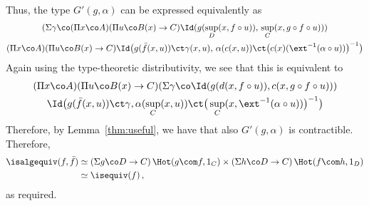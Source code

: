 Thus, the type $G'(g,\alpha)$ can be expressed equivalently as
\begin{multline*}
(\Sigma \gamma \co 
(\Pi x \co A)
(\Pi u \co B(x) \to C) 
\Id(g(\sup_D(x,f \circ u)),\, \sup_C(x,g \circ f \circ u))) \\ 
(\Pi x \co A) 
(\Pi u \co B(x) \to C) 
	\Id\big(g(\bar{f}(x,u)) \ct \gamma(x,u),\, \alpha(c(x,u)) \ct \big(c(x)(\ext^{-1}(\alpha \circ u))\big)^{-1}\big)
\end{multline*}
Again using the type-theoretic distributivity, we see that this is equivalent to
\begin{multline*}
(\Pi x \co A)
(\Pi u \co B(x) \to C)
(\Sigma \gamma \co \Id(g(d(x,f \circ u)), c(x,g \circ f \circ u))) \\
  \Id \big(g(\bar{f}(x,u)) \ct \gamma , \alpha(\sup_C(x,u)) \ct \big(\sup_C(x, \ext^{-1}(\alpha \circ u))\big)^{-1}\big)
  \end{multline*} 
Therefore, by Lemma~\ref{thm:useful}, we have that also $G'(g,\alpha)$ is contractible.  Therefore,
\begin{align*} 
\isalgequiv(f,\bar{f}) 
 & \simeq (\Sigma g \co D \to C) \, \Hot( g \com f,1_C )\times 
		(\Sigma h  \co D \to C) \, \Hot( f \com h, 1_D)  \\
 & \simeq  \isequiv(f) \, ,
\end{align*} 
as required.
